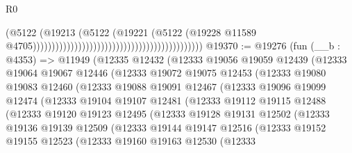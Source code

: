 \begin{lexlean}{R0}
\begin{coremodule}
                                                                                  (@5122
                                                                                    (@19213
                                                                                      (@5122
                                                                                        (@19221
                                                                                          (@5122
                                                                                            (@19228
                                                                                              @11589
                                                                                              @4705)))))))))))))))))))))))))))))))))))))))))))))
@19370 := @19276
    (fun (__b : @4353) =>
    @11949
      (@12335
        @12432
        (@12333
          @19056
          @19059
          @12439
          (@12333
            @19064
            @19067
            @12446
            (@12333
              @19072
              @19075
              @12453
              (@12333
                @19080
                @19083
                @12460
                (@12333
                  @19088
                  @19091
                  @12467
                  (@12333
                    @19096
                    @19099
                    @12474
                    (@12333
                      @19104
                      @19107
                      @12481
                      (@12333
                        @19112
                        @19115
                        @12488
                        (@12333
                          @19120
                          @19123
                          @12495
                          (@12333
                            @19128
                            @19131
                            @12502
                            (@12333
                              @19136
                              @19139
                              @12509
                              (@12333
                                @19144
                                @19147
                                @12516
                                (@12333
                                  @19152
                                  @19155
                                  @12523
                                  (@12333
                                    @19160
                                    @19163
                                    @12530
                                    (@12333

\end{coremodule}
\end{lexlean}
